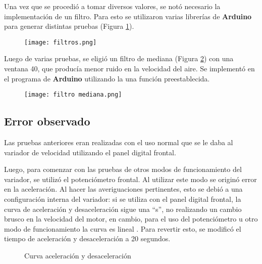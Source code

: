 Una vez que se procedió a tomar diversos valores, se notó necesario la implementación de un filtro. Para esto se utilizaron varias librerías de \textbf{Arduino} para generar distintas pruebas (Figura \ref{fig:filtros}).

\begin{figure}[!h]
	\centering
	\texttt{[image: filtros.png]}
	\label{fig:filtros}
\end{figure}

Luego de varias pruebas, se eligió un filtro de mediana (Figura \ref{fig:filtrosm}) con una ventana 40, que producía menor ruido en la velocidad del aire. Se implementó en el programa de \textbf{Arduino} utilizando la una función preestablecida.

\begin{figure}[htb]
	\centering
	\texttt{[image: filtro mediana.png]}
	\label{fig:filtrosm}
\end{figure}


\subsection{Error observado}
Las pruebas anteriores eran realizadas con el uso normal que se le daba al variador de velocidad utilizando el panel digital frontal.

Luego, para comenzar con las pruebas de otros modos de funcionamiento del variador, se utilizó el potenciómetro frontal. Al utilizar este modo se originó error en la aceleración.   Al hacer las averiguaciones pertinentes, esto se debió a una configuración interna del variador: si se utiliza con el panel digital frontal, la curva de aceleración y desaceleración sigue una “s”, no realizando un cambio brusco en la velocidad del motor, en cambio, para el uso del potenciómetro u otro modo de funcionamiento la curva es lineal . Para revertir esto, se modificó el tiempo de aceleración y desaceleración a 20 segundos.

\begin{figure}[htbp]
	\centering
	\caption{Curva aceleración y desaceleración} \label{fig:curva}
\end{figure}


\newpage